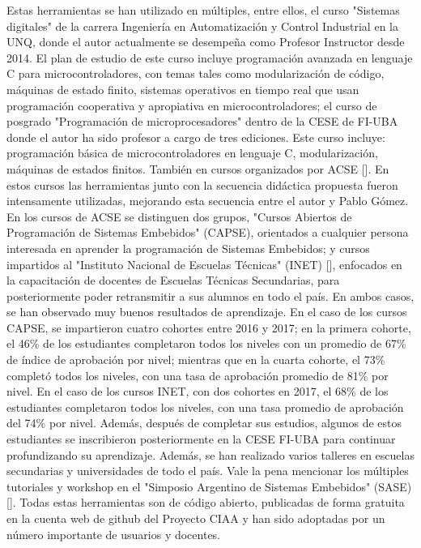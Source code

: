 Estas herramientas se han utilizado en múltiples, entre
ellos, el curso "Sistemas digitales" de la carrera Ingeniería en
Automatización y Control Industrial en la UNQ, donde el
autor actualmente se desempeña como Profesor Instructor
desde 2014. El plan de estudio de este curso incluye
programación avanzada en lenguaje C para
microcontroladores, con temas tales como modularización de
código, máquinas de estado finito, sistemas operativos en
tiempo real que usan programación cooperativa y apropiativa
en microcontroladores; el curso de posgrado "Programación
de microprocesadores" dentro de la CESE de FI-UBA donde
el autor ha sido profesor a cargo de tres ediciones. Este curso
incluye: programación básica de microcontroladores en
lenguaje C, modularización, máquinas de estados finitos.
También en cursos organizados por ACSE []. En estos
cursos las herramientas junto con la secuencia didáctica
propuesta fueron intensamente utilizadas, mejorando esta
secuencia entre el autor y Pablo Gómez. En los cursos de
ACSE se distinguen dos grupos, "Cursos Abiertos de
Programación de Sistemas Embebidos" (CAPSE), orientados a
cualquier persona interesada en aprender la programación de
Sistemas Embebidos; y cursos impartidos al "Instituto
Nacional de Escuelas Técnicas" (INET) [], enfocados en la
capacitación de docentes de Escuelas Técnicas Secundarias,
para posteriormente poder retransmitir a sus alumnos en todo
el país. En ambos casos, se han observado muy buenos
resultados de aprendizaje. En el caso de los cursos CAPSE, se
impartieron cuatro cohortes entre 2016 y 2017; en la primera
cohorte, el 46\% de los estudiantes completaron todos los
niveles con un promedio de 67\% de índice de aprobación por
nivel; mientras que en la cuarta cohorte, el 73\% completó
todos los niveles, con una tasa de aprobación promedio de
81\% por nivel. En el caso de los cursos INET, con dos
cohortes en 2017, el 68\% de los estudiantes completaron todos
los niveles, con una tasa promedio de aprobación del 74\% por
nivel. Además, después de completar sus estudios, algunos de
estos estudiantes se inscribieron posteriormente en la CESE
FI-UBA para continuar profundizando su aprendizaje.
Además, se han realizado varios talleres en escuelas
secundarias y universidades de todo el país. Vale la pena
mencionar los múltiples tutoriales y workshop en el "Simposio
Argentino de Sistemas Embebidos" (SASE) [].
Todas estas herramientas son de código abierto, publicadas de
forma gratuita en la cuenta web de github del Proyecto CIAA
y han sido adoptadas por un número importante de usuarios y
docentes.